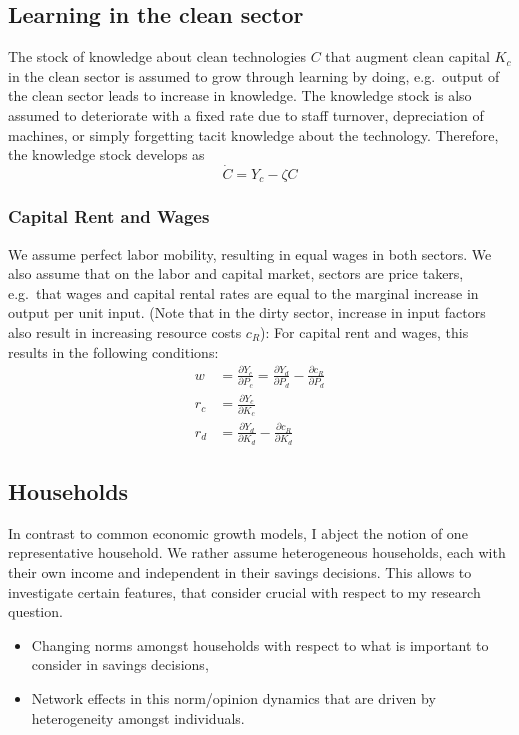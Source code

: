 \subsection{Learning in the clean sector}
\label{learning}
The stock of knowledge about clean technologies $C$ that augment clean capital $K_c$ in the clean sector is assumed to grow through learning by doing, e.g.\ output of the clean sector leads to increase in knowledge. The knowledge stock is also assumed to deteriorate with a fixed rate due to staff turnover, depreciation of machines, or simply forgetting tacit knowledge about the technology. Therefore, the knowledge stock develops as
\begin{equation}
	\dot{C} = Y_c - \zeta C
	\label{knowledge_stock}
\end{equation}
\subsubsection{Capital Rent and Wages}
We assume perfect labor mobility, resulting in equal wages in both sectors. We also assume that on the labor and capital market, sectors are price takers, e.g.\ that wages and capital rental rates are equal to the marginal increase in output per unit input. (Note that in the dirty sector, increase in input factors also result in increasing resource costs $c_R$):
For capital rent and wages, this results in the following conditions:
\begin{align}
	w &= \frac{\partial Y_c}{\partial P_c} = \frac{\partial Y_d}{\partial P_d} - \frac{\partial c_R}{\partial P_d}\\
	r_c &= \frac{\partial Y_c}{\partial K_c}\\
	r_d &= \frac{\partial Y_d}{\partial K_d} - \frac{\partial c_R}{\partial K_d}
\end{align}

\subsection{Households}
In contrast to common economic growth models, I abject the notion of one representative household. We rather assume heterogeneous households, each with their own income and independent in their savings decisions. This allows to investigate certain features, that consider crucial with respect to my research question.
\begin{itemize}
	\item Changing norms amongst households with respect to what is important to consider in savings decisions,
	\item Network effects in this norm/opinion dynamics that are driven by heterogeneity amongst individuals.
\end{itemize}

